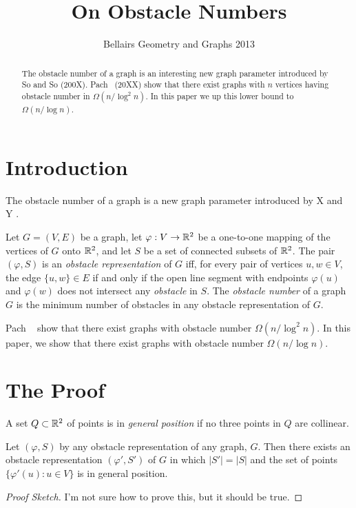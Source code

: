 \documentclass{patmorin}
\title{On Obstacle Numbers}
\author{Bellairs Geometry and Graphs 2013}
\begin{document}
\maketitle

\begin{abstract}
The obstacle number of a graph is an interesting new graph parameter
introduced by So and So (200X).  Pach \etal\ (20XX) show that there
exist graphs with $n$ vertices having obstacle number in $\Omega(n/\log^2
n)$. In this paper we up this lower bound to $\Omega(n/\log n)$.
\end{abstract}

\section{Introduction}

The obstacle number of a graph is a new graph parameter introduced by
X and Y \cite{xy}.

Let $G=(V,E)$ be a graph, let $\varphi:V\to \mathbb{R}^2$ be a one-to-one
mapping of the vertices of $G$ onto $\mathbb{R}^2$, and let $S$ be a set of
connected subsets of $\mathbb{R}^2$.  The pair $(\varphi,S)$ is an \emph{obstacle
representation} of $G$ iff, for every pair of vertices $u,w\in V$, the
edge $\{u,w\}\in E$ if and only if the open line segment with endpoints
$\varphi(u)$ and $\varphi(w)$ does not intersect any \emph{obstacle}
in $S$.  The \emph{obstacle number} of a graph $G$ is the minimum number
of obstacles in any obstacle representation of $G$.

Pach \etal\ \cite{paXX} show that there exist graphs with obstacle
number $\Omega(n/\log^2 n)$.  In this paper, we show that there exist
graphs with obstacle number $\Omega(n/\log n)$.

\section{The Proof}

A set $Q\subset\mathbb{R}^2$ of points is in \emph{general position} if no three
points in $Q$ are collinear.

\begin{lem}
  Let $(\varphi,S)$ by any obstacle representation of any graph,
  $G$. Then there exists an obstacle representation $(\varphi',S')$ of
  $G$ in which $|S'|=|S|$ and the set of points $\{\varphi'(u):u\in V\}$
  is in general position.
\end{lem}

\begin{proof}[Proof Sketch]
  I'm not sure how to prove this, but it should be true.
\end{proof}
\end{document}
